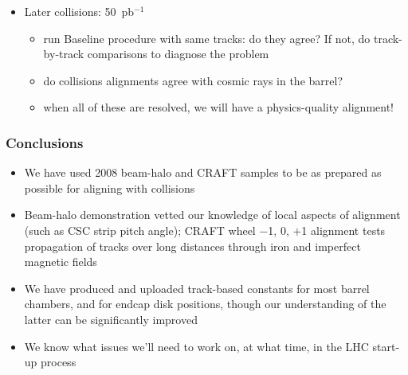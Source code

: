 \documentclass[compress]{beamer}
\begin{document}
\begin{frame}
\begin{itemize}
\item Later collisions: 50~pb$^{-1}$
\begin{itemize}
\item \scriptsize run Baseline procedure with same tracks: do they agree?  If not, do track-by-track comparisons to diagnose the problem
\item \scriptsize do collisions alignments agree with cosmic rays in the barrel?
\item \scriptsize when all of these are resolved, we will have a physics-quality alignment!
\end{itemize}
\end{itemize}
\end{frame}


\begin{frame}
\frametitle{Conclusions}
\begin{itemize}\setlength{\itemsep}{0.5 cm}
\item We have used 2008 beam-halo and CRAFT samples to be as prepared as possible for aligning with collisions
\item Beam-halo demonstration vetted our knowledge of local aspects of
  alignment (such as CSC strip pitch angle); CRAFT wheel $-$1, 0, $+$1 alignment tests
  propagation of tracks over long distances through iron and imperfect
  magnetic fields
\item We have produced and uploaded track-based constants for most
  barrel chambers, and for endcap disk positions, though our understanding
  of the latter can be significantly improved
\item We know what issues we'll need to work on, at what time, in the
  LHC start-up process
\end{itemize}
\label{numpages}
\end{frame}
\end{document}
